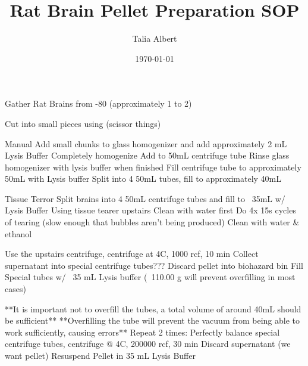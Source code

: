 \documentclass[12pt, letterpaper]{article}
\title{Rat Brain Pellet Preparation SOP}
\author{
    Talia Albert
}
\date{\today}
\begin{document}
\maketitle
\tableofcontents

Gather Rat Brains from -80 (approximately 1 to 2)

Cut into small pieces using (scissor things)

Manual
    Add small chunks to glass homogenizer and add approximately 2 mL Lysis Buffer
    Completely homogenize
    Add to 50mL centrifuge tube
    Rinse glass homogenizer with lysis buffer when finished
    Fill centrifuge tube to approximately 50mL with Lysis buffer
    Split into 4 50mL tubes, fill to approximately 40mL
    

Tissue Terror
    Split brains into 4 50mL centrifuge tubes and fill to ~35mL w/ Lysis Buffer
    Using tissue tearer upstairs
        Clean with water first
        Do 4x 15s cycles of tearing (slow enough that bubbles aren't being produced)
        Clean with water & ethanol


Use the upstairs centrifuge, centrifuge at 4C, 1000 rcf, 10 min
    Collect supernatant into special centrifuge tubes??? 
    Discard pellet into biohazard bin
    Fill Special tubes w/ ~35 mL Lysis buffer (~110.00 g will prevent overfilling in most cases)

    **It is important not to overfill the tubes, a total volume of around 40mL should be sufficient**
    **Overfilling the tube will prevent the vacuum from being able to work sufficiently, causing errors**
Repeat 2 times:
    Perfectly balance special centrifuge tubes, centrifuge @ 4C, 200000 rcf, 30 min
        Discard supernatant (we want pellet)
        Resuspend Pellet in 35 mL Lysis Buffer
\end{document}
